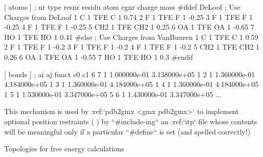     [ atoms ]
    ; nr     type     resnr    residu     atom      cgnr      charge        mass
    #ifdef DeLoof
    ; Use Charges from DeLoof
       1        C        1        TFE        C         1        0.74        
       2        F        1        TFE        F         1       -0.25        
       3        F        1        TFE        F         1       -0.25        
       4        F        1        TFE        F         1       -0.25        
       5      CH2        1        TFE      CH2         1        0.25        
       6       OA        1        TFE       OA         1       -0.65        
       7       HO        1        TFE       HO         1        0.41        
    #else
    ; Use Charges from VanBuuren
       1        C        1        TFE        C         1        0.59        
       2        F        1        TFE        F         1       -0.2         
       3        F        1        TFE        F         1       -0.2         
       4        F        1        TFE        F         1       -0.2         
       5      CH2        1        TFE      CH2         1        0.26        
       6       OA        1        TFE       OA         1       -0.55        
       7       HO        1        TFE       HO         1        0.3         
    #endif

    [ bonds ]
    ;  ai    aj funct           c0           c1
        6     7     1 1.000000e-01 3.138000e+05 
        1     2     1 1.360000e-01 4.184000e+05 
        1     3     1 1.360000e-01 4.184000e+05 
        1     4     1 1.360000e-01 4.184000e+05 
        1     5     1 1.530000e-01 3.347000e+05 
        5     6     1 1.430000e-01 3.347000e+05 
    ...

This mechanism is used by :ref:`pdb2gmx <gmx pdb2gmx>` to implement optional
position restraints (
) by
``#include-ing`` an :ref:`itp` file whose contents
will be meaningful only if a particular ``#define`` is set
(and spelled correctly!)

Topologies for free energy calculations
~~~~~~~~~~~~~~~~~~~~~~~~~~~~~~~~~~~~~~~

